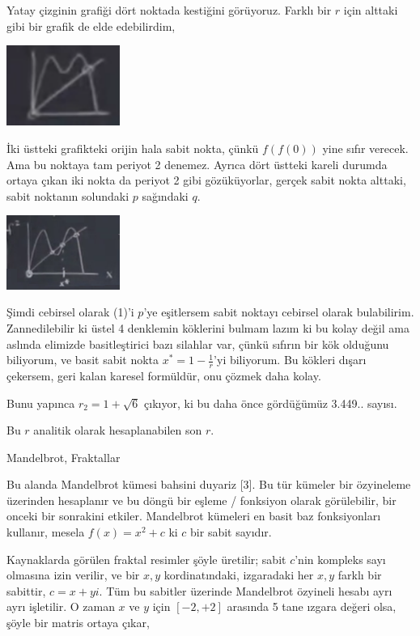 \documentclass[12pt,fleqn]{article}\usepackage{../../common}
\begin{document}
Yatay çizginin grafiği dört noktada kestiğini görüyoruz. Farklı bir $r$
için alttaki gibi bir grafik de elde edebilirdim,

\includegraphics[width=10em]{19_17.png}

İki üstteki grafikteki orijin hala sabit nokta, çünkü $f(f(0))$ yine sıfır
verecek. Ama bu noktaya tam periyot 2 denemez. Ayrıca dört üstteki kareli
durumda ortaya çıkan iki nokta da periyot 2 gibi gözüküyorlar, gerçek sabit
nokta alttaki, sabit noktanın solundaki $p$ sağındaki $q$. 

\includegraphics[width=10em]{19_18.png}

Şimdi cebirsel olarak (1)'i $p$'ye eşitlersem sabit noktayı cebirsel olarak
bulabilirim. Zannedilebilir ki üstel 4 denklemin köklerini bulmam lazım ki
bu kolay değil ama aslında elimizde basitleştirici bazı silahlar var, çünkü
sıfırın bir kök olduğunu biliyorum, ve basit sabit nokta
$x^\ast = 1-\frac{1}{r}$'yi biliyorum. Bu kökleri dışarı çekersem, geri kalan
karesel formüldür, onu çözmek daha kolay.

Bunu yapınca $r_2 = 1+\sqrt{6}$ çıkıyor, ki bu daha önce gördüğümüz
3.449.. sayısı.

Bu $r$ analitik olarak hesaplanabilen son $r$. 

Mandelbrot, Fraktallar

Bu alanda Mandelbrot kümesi bahsini duyariz [3]. Bu tür kümeler bir özyineleme
üzerinden hesaplanır ve bu döngü bir eşleme / fonksiyon olarak görülebilir, bir
onceki bir sonrakini etkiler. Mandelbrot kümeleri en basit baz fonksiyonları
kullanır, mesela $f(x) = x^2 + c$ ki $c$ bir sabit sayıdır.

Kaynaklarda görülen fraktal resimler şöyle üretilir; sabit $c$'nin kompleks sayı
olmasına izin verilir, ve bir $x,y$ kordinatındaki, izgaradaki her $x,y$ farklı
bir sabittir, $c = x + y i$. Tüm bu sabitler üzerinde Mandelbrot özyineli hesabı
ayrı ayrı işletilir. O zaman $x$ ve $y$ için $[-2,+2]$ arasında 5 tane ızgara
değeri olsa, şöyle bir matris ortaya çıkar,
\end{document}
